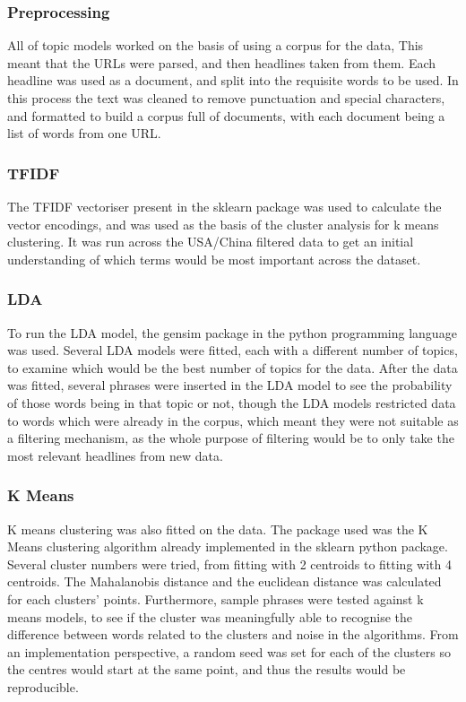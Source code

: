 \subsubsection{Preprocessing}
All of topic models worked on the basis of using a corpus for the data, This meant that the URLs were parsed, and then headlines taken from them. Each headline was used as a document, and split into the requisite words to be used. In this process the text was cleaned to remove punctuation and special characters, and formatted to build a corpus full of documents, with each document being a list of words from one URL. 
\subsubsection{TFIDF}
The TFIDF vectoriser present in the sklearn package was used to calculate the vector encodings, and was used as the basis of the cluster analysis for k means clustering. It was run across the USA/China filtered data to get an initial understanding of which terms would be most important across the dataset.

\subsubsection{LDA}
To run the LDA model, the gensim package in the python programming language was used. Several LDA models were fitted, each with a different number of topics, to examine which would be the best number of topics for the data. After the data was fitted, several phrases were inserted in the LDA model to see the probability of those words being in that topic or not, though the LDA models restricted data to words which were already in the corpus, which meant they were not suitable as a filtering mechanism, as the whole purpose of filtering would be to only take the most relevant headlines from new data.

\subsubsection{K Means}
K means clustering was also fitted on the data. The package used was the K Means clustering algorithm already implemented in the sklearn python package. Several cluster numbers were tried, from fitting with 2 centroids to fitting with 4 centroids. The Mahalanobis distance and the euclidean distance was calculated for each clusters' points. Furthermore, sample phrases were tested against k means models, to see if the cluster was meaningfully able to recognise the difference between words related to the clusters and noise in the algorithms. From an implementation perspective, a random seed was set for each of the clusters so the centres would start at the same point, and thus the results would be reproducible. 
